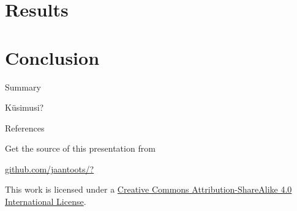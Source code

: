 \documentclass{beamer}
\begin{document}
\section{Results}

\begin{frame}{}
  \begin{block}{}
  \end{block}
\end{frame}

\section{Conclusion}

\begin{frame}{Summary}

\end{frame}

\begin{frame}[standout]
  Küsimusi?
\end{frame}

\appendix

\begin{frame}[allowframebreaks]{References}

  
  

\end{frame}

\begin{frame}[plain]
  Get the source of this presentation from

  \begin{center}
    \href{https://github.com/jaantoots/?}{github.com/jaantoots/?}
  \end{center}

  This work is licensed under a
  \href{http://creativecommons.org/licenses/by-sa/4.0/}{Creative
    Commons Attribution-ShareAlike 4.0 International License}.

  \begin{center}\ccbysa\end{center}
\end{frame}
\end{document}
